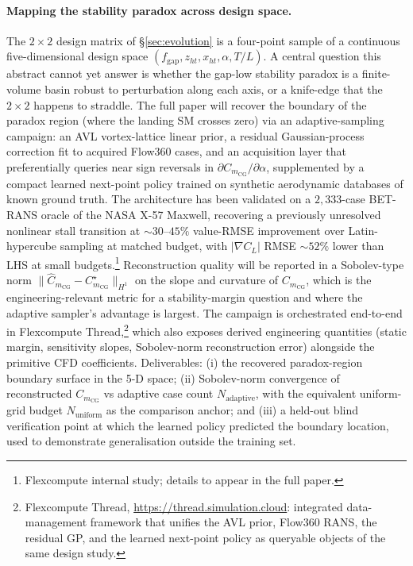 \documentclass[conf]{new-aiaa}
\newcommand{\sm}{\mathrm{SM}}
\begin{document}
\paragraph{Mapping the stability paradox across design space.}
The $2\times 2$ design matrix of \S\ref{sec:evolution} is a
four-point sample of a continuous five-dimensional design
space $(f_{\mathrm{gap}}, z_{ht}, x_{ht}, \alpha, T/L)$.  A
central question this abstract cannot yet answer is whether
the gap-low stability paradox is a finite-volume basin robust
to perturbation along each axis, or a knife-edge that the
$2\times 2$ happens to straddle.  The full paper will recover
the boundary of the paradox region (where the landing $\sm$
crosses zero) via an adaptive-sampling campaign: an AVL
vortex-lattice linear prior, a residual Gaussian-process
correction fit to acquired Flow360 cases, and an acquisition
layer that preferentially queries near sign reversals in
$\partial C_{m_{\mathrm{CG}}}/\partial\alpha$, supplemented by
a compact learned next-point policy trained on synthetic
aerodynamic databases of known ground truth.  The architecture
has been validated on a $2{,}333$-case BET-RANS oracle of the
NASA X-57 Maxwell, recovering a previously unresolved
nonlinear stall transition at $\sim 30$--$45\%$ value-RMSE
improvement over Latin-hypercube sampling at matched budget,
with $|\nabla C_L|$ RMSE $\sim 52\%$ lower than LHS at small
budgets.\footnote{Flexcompute internal study; details to
appear in the full paper.}  Reconstruction quality will be
reported in a Sobolev-type norm
$\|\hat C_{m_{\mathrm{CG}}}-C_{m_{\mathrm{CG}}}^{\star}\|_{H^1}$
on the slope and curvature of $C_{m_{\mathrm{CG}}}$, which is
the engineering-relevant metric for a stability-margin
question and where the adaptive sampler's advantage is
largest.  The campaign is orchestrated end-to-end in
Flexcompute Thread,\footnote{Flexcompute Thread,
\url{https://thread.simulation.cloud}: integrated
data-management framework that unifies the AVL prior,
Flow360 RANS, the residual GP, and the learned next-point
policy as queryable objects of the same design study.} which
also exposes derived engineering quantities (static margin,
sensitivity slopes, Sobolev-norm reconstruction error)
alongside the primitive CFD coefficients.  Deliverables:
(i) the recovered paradox-region boundary surface in the 5-D
space; (ii) Sobolev-norm convergence of reconstructed
$C_{m_{\mathrm{CG}}}$ vs adaptive case count
$N_{\mathrm{adaptive}}$, with the equivalent uniform-grid
budget $N_{\mathrm{uniform}}$ as the comparison anchor; and
(iii) a held-out blind verification point at which the
learned policy predicted the boundary location, used to
demonstrate generalisation outside the training set.
\end{document}
